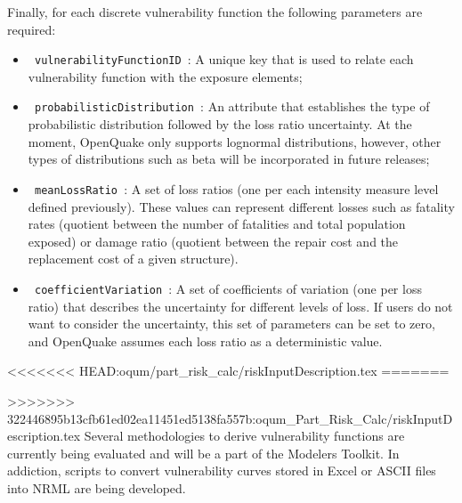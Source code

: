 Finally, for each discrete vulnerability function the following parameters are required:
\begin{itemize}
\item  \Verb+ vulnerabilityFunctionID +: A unique key that is used to relate each vulnerability function with the exposure elements;
\item  \Verb+ probabilisticDistribution +: An attribute that establishes the type of probabilistic distribution followed by the loss ratio uncertainty. At the moment, OpenQuake only supports lognormal distributions, however, other types of distributions such as beta will be incorporated in future releases;
\item  \Verb+ meanLossRatio +: A set of loss ratios (one per each intensity measure level defined previously). These values can represent different losses such as fatality rates (quotient between the number of fatalities and total population exposed) or damage ratio (quotient between the repair cost and the replacement cost of a given structure).
\item  \Verb+ coefficientVariation +: A set of coefficients of variation (one per loss ratio) that describes the uncertainty for different levels of loss. If users do not want to consider the uncertainty, this set of parameters can be set to zero, and OpenQuake assumes each loss ratio as a deterministic value. 
\end{itemize}

<<<<<<< HEAD:oqum/part_risk_calc/riskInputDescription.tex
=======

>>>>>>> 322446895b13cfb61ed02ea11451ed5138fa557b:oqum_Part_Risk_Calc/riskInputDescription.tex
Several methodologies to derive vulnerability functions are currently being evaluated and will be a part of the Modelers Toolkit. In addiction, scripts to convert vulnerability curves stored in Excel or ASCII files into NRML are being developed.
